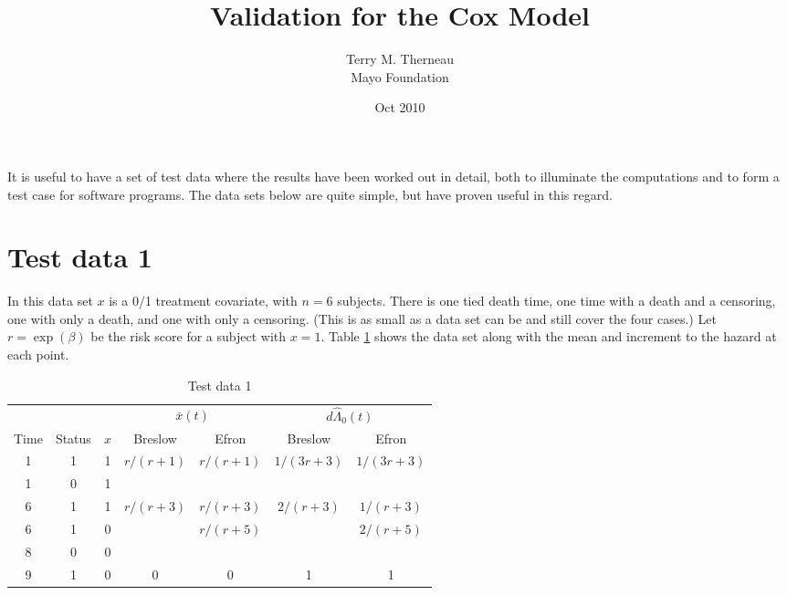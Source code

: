 \documentclass[11pt]{article}
\title {Validation for the Cox Model}
\author{Terry M. Therneau \\
        Mayo Foundation }
\date{Oct 2010}
\def\xbar{\bar x}
\def\lhat{\hat \Lambda}
\begin{document}
\maketitle


It is useful to have a set of test data where the results have been
worked out in detail, both to illuminate the computations and to form
a test case for software programs.
The data sets below are quite simple, but have proven useful in this
regard.


\section{Test data 1}
In this data set $x$ is a 0/1 treatment covariate, with $n=6$ subjects. 
There is one tied death time, one time with a death and a censoring,
one with only a death, and one with only a censoring.
(This is as small as a data set can be and still cover the four cases.) 
Let $r = \exp(\beta)$ be the risk score for a subject with $x=1$.
Table \ref{tab:val1} shows the data set along with the mean and
increment to the hazard at each point.

\begin{table} \centering
\begin{tabular}{ccc|cc|cc}
&&& \multicolumn{2}{c|}{$\xbar(t)$} & \multicolumn{2}{c}{$d\lhat_0(t)$} \\
Time&Status&$x$&Breslow&Efron&Breslow&Efron \\ \hline 
1&1&1&$r/(r+1)$ & $r/(r+1)$& $1/(3r+3)$ & $1/(3r+3)$ \\
1&0&1&&&&\\
6&1&1& $r/(r+3)$ & $r/(r+3)$ & $2/(r+3)$& $1/(r+3)$ \\
6&1&0& &  $r/(r+5)$ && $2/(r+5)$ \\
8&0&0&&&& \\
9&1&0&0&0& 1& 1\\
\end{tabular}
\caption{Test data 1}
\label{tab:val1}
\end{table}
\end{document}
